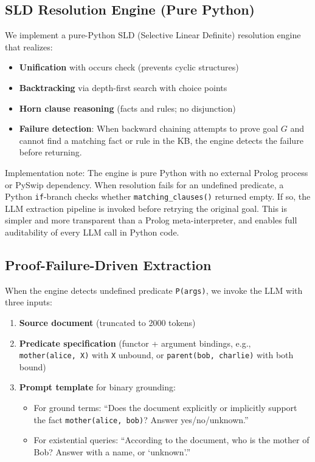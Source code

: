 \documentclass[11pt,letterpaper]{article}
\begin{document}
\subsection{SLD Resolution Engine (Pure Python)}

We implement a pure-Python SLD (Selective Linear Definite) resolution engine that realizes:
\begin{itemize}
  \item \textbf{Unification} with occurs check (prevents cyclic structures)
  \item \textbf{Backtracking} via depth-first search with choice points
  \item \textbf{Horn clause reasoning} (facts and rules; no disjunction)
  \item \textbf{Failure detection}: When backward chaining attempts to prove goal $G$ and
    cannot find a matching fact or rule in the KB, the engine detects the failure before
    returning.
\end{itemize}

Implementation note: The engine is pure Python with no external Prolog process or PySwip
dependency. When resolution fails for an undefined predicate, a Python \texttt{if}-branch
checks whether \texttt{matching\_clauses()} returned empty. If so, the LLM extraction
pipeline is invoked before retrying the original goal. This is simpler and more transparent
than a Prolog meta-interpreter, and enables full auditability of every LLM call in Python
code.

\subsection{Proof-Failure-Driven Extraction}

When the engine detects undefined predicate \texttt{P(args)}, we invoke the LLM with three
inputs:

\begin{enumerate}
  \item \textbf{Source document} (truncated to 2000 tokens)
  \item \textbf{Predicate specification} (functor + argument bindings, e.g.,
    \texttt{mother(alice,~X)} with \texttt{X} unbound, or \texttt{parent(bob,~charlie)} with
    both bound)
  \item \textbf{Prompt template} for binary grounding:
    \begin{itemize}
      \item For ground terms: ``Does the document explicitly or implicitly support the fact
        \texttt{mother(alice, bob)}? Answer yes/no/unknown.''
      \item For existential queries: ``According to the document, who is the mother of Bob?
        Answer with a name, or `unknown'.''
    \end{itemize}
\end{enumerate}
\end{document}
